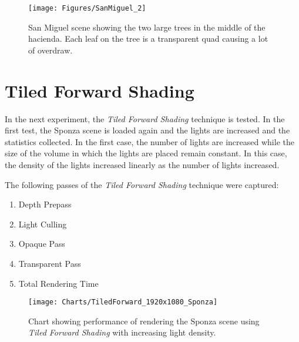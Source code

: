 \begin{figure}[H]
\centering
\texttt{[image: Figures/SanMiguel\_2]}
\decoRule
\caption{San Miguel scene showing the two large trees in the middle of the hacienda. Each leaf on the tree is a transparent quad causing a lot of overdraw.}
\label{fig:SanMiguel_2}
\end{figure}

\section{Tiled Forward Shading}

In the next experiment, the \emph{Tiled Forward Shading} technique is tested. In the first test, the Sponza scene is loaded again and the lights are increased and the statistics collected. In the first case, the number of lights are increased while the size of the volume in which the lights are placed remain constant. In this case, the density of the lights increased linearly as the number of lights increased.

The following passes of the \emph{Tiled Forward Shading} technique were captured:

\begin{enumerate}
\item{Depth Prepass}
\item{Light Culling}
\item{Opaque Pass}
\item{Transparent Pass}
\item{Total Rendering Time}
\end{enumerate}

\begin{figure}[H]
\centering
\texttt{[image: Charts/TiledForward\_1920x1080\_Sponza]}
\decoRule
\caption{Chart showing performance of rendering the Sponza scene using \emph{Tiled Forward Shading} with increasing light density.}
\label{fig:TiledForward_1920x1080_Sponza}
\end{figure}

